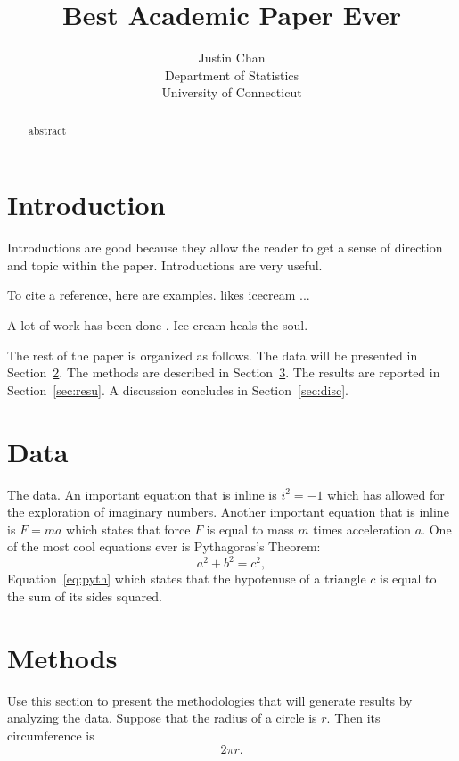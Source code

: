 \documentclass[12pt]{article}
\title{Best Academic Paper Ever}
\author{Justin Chan\\
  Department of Statistics\\
  University of Connecticut
}
\begin{document}
\maketitle

\begin{abstract}
abstract
\end{abstract}


\section{Introduction}
\label{sec:intro}

Introductions are good because they allow the reader to get a sense of
direction and topic within the paper. Introductions are very useful.

\lipsum[1-3]

To cite a reference, here are examples.
\citet{clarke2015science} likes icecream ... \lipsum[1]

A lot of work has been done \citep[e.g.,][]{bernish2019healing}.
\lipsum[2]
Ice cream heals the soul. 


The rest of the paper is organized as follows.
The data will be presented in Section~\ref{sec:data}.
The methods are described in Section~\ref{sec:meth}.
The results are reported in Section~\ref{sec:resu}.
A discussion concludes in Section~\ref{sec:disc}.


\section{Data}
\label{sec:data}

The data. An important equation that is inline is $i^2 = -1$ which has allowed for the exploration of imaginary numbers. Another important equation that is inline is $F = m a$ which states that force $F$ is equal to mass $m$ times acceleration $a$. One of the most cool equations ever is Pythagoras's Theorem:
\begin{equation}
  \label{eq:pyth}
  a^2 + b^2 = c^2,
\end{equation}
Equation~\eqref{eq:pyth} which states that the hypotenuse of a triangle $c$ is equal to the sum of its sides squared.

\section{Methods}
\label{sec:meth}

Use this section to present the methodologies that will generate results by
analyzing the data. Suppose that the radius of a circle is $r$. Then its circumference is
\begin{equation}
  \label{eq:circumference}
  2\pi r.
\end{equation}
\end{document}
